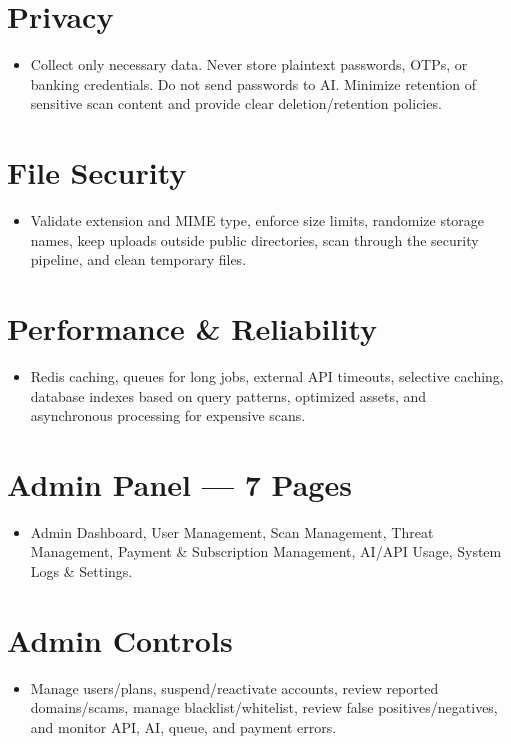 \documentclass[11pt,a4paper]{article}
\begin{document}
\section{Privacy}
\begin{itemize}[noitemsep]
    \item Collect only necessary data. Never store plaintext passwords, OTPs, or banking credentials. Do not send passwords to AI. Minimize retention of sensitive scan content and provide clear deletion/retention policies.
\end{itemize}

\section{File Security}
\begin{itemize}[noitemsep]
    \item Validate extension and MIME type, enforce size limits, randomize storage names, keep uploads outside public directories, scan through the security pipeline, and clean temporary files.
\end{itemize}

\section{Performance \& Reliability}
\begin{itemize}[noitemsep]
    \item Redis caching, queues for long jobs, external API timeouts, selective caching, database indexes based on query patterns, optimized assets, and asynchronous processing for expensive scans.
\end{itemize}

\section{Admin Panel — 7 Pages}
\begin{itemize}[noitemsep]
    \item Admin Dashboard, User Management, Scan Management, Threat Management, Payment \& Subscription Management, AI/API Usage, System Logs \& Settings.
\end{itemize}

\section{Admin Controls}
\begin{itemize}[noitemsep]
    \item Manage users/plans, suspend/reactivate accounts, review reported domains/scams, manage blacklist/whitelist, review false positives/negatives, and monitor API, AI, queue, and payment errors.
\end{itemize}
\end{document}
